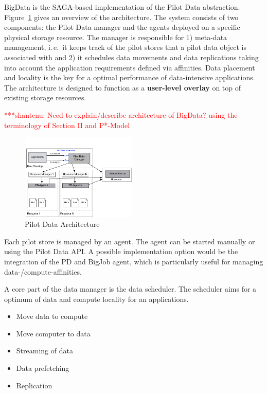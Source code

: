\documentclass[conference,final]{IEEEtran}
\newcommand{\jhanote}[1]{ {\textcolor{red} { ***shantenu: #1 }}}
\newcommand{\alnote}[1]{ {\textcolor{blue} { ***andre: #1 }}}
\newcommand{\alnote}[1]{}
\newcommand{\jhanote}[1]{}
\begin{document}

BigData is the SAGA-based implementation of the Pilot Data abstraction.
Figure~\ref{fig:figures_distributed_pilot_job} gives an overview of the
architecture. The system consists of two components: the Pilot Data manager and
the agents deployed on a specific physical storage resource. The manager is
responsible for 1) meta-data management, i.\,e.\ it keeps track of the pilot
stores that a pilot data object is associated with and 2) it schedules data
movements and data replications taking into account the application requirements 
defined via affinities. Data placement and locality is the key for a optimal 
performance of data-intensive applications. The architecture is designed to 
function as a \textbf{user-level overlay} on top of existing storage resources.


\jhanote{Need to explain/describe architecture of BigData? using the
  terminology of Section II and P*-Model}

\begin{figure}[htbp]
    \centering
        \includegraphics[width=0.49\textwidth]{figures/pilot-data-manager.pdf}
    \caption{Pilot Data Architecture}
    \label{fig:figures_distributed_pilot_job}
\end{figure}

Each pilot store is managed by an agent. The agent can be started manually or 
using the Pilot Data API. A possible implementation option would be the 
integration of the PD and BigJob agent, which is particularly useful for 
managing data-/compute-affinities.

A core part of the data manager is the data scheduler. The scheduler aims for a 
optimum of data and compute locality for an applications.
\begin{itemize}
	\item Move data to compute
	\item Move computer to data
	\item Streaming of data
	\item Data prefetching 
	\item Replication
\end{itemize}
\end{document}
